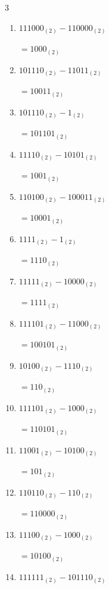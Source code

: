 \begin{multicols}{3}
\begin{enumerate}
  \item $111000_{(2)} - 110000_{(2)}$

        $=1000_{(2)}$

  \item $101110_{(2)} - 11011_{(2)}$

        $=10011_{(2)}$

  \item $101110_{(2)} - 1_{(2)}$

        $=101101_{(2)}$

\columnbreak %

  \item $11110_{(2)} - 10101_{(2)}$

        $=1001_{(2)}$

  \item $110100_{(2)} - 100011_{(2)}$

        $=10001_{(2)}$

  \item $1111_{(2)} - 1_{(2)}$

        $=1110_{(2)}$

  \item $11111_{(2)} - 10000_{(2)}$

        $=1111_{(2)}$

  \item $111101_{(2)} - 11000_{(2)}$

        $=100101_{(2)}$

  \item $10100_{(2)} - 1110_{(2)}$

        $=110_{(2)}$

  \item $111101_{(2)} - 1000_{(2)}$

        $=110101_{(2)}$

  \item $11001_{(2)} - 10100_{(2)}$

        $=101_{(2)}$

  \item $110110_{(2)} - 110_{(2)}$

        $=110000_{(2)}$

  \item $11100_{(2)} - 1000_{(2)}$

        $=10100_{(2)}$

\columnbreak %

\resetques

  \item $111111_{(2)} - 101110_{(2)}$


\end{enumerate}
\end{multicols}
